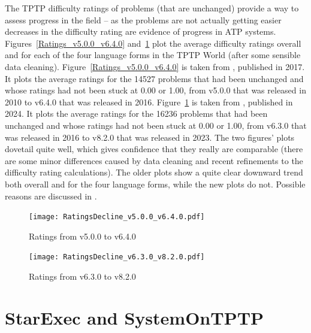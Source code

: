 \documentclass{easychair}
\begin{document}
The TPTP difficulty ratings of problems (that are unchanged) provide a way to assess progress 
in the field -- as the problems are not actually getting easier decreases in the difficulty
rating are evidence of progress in ATP systems.
Figures~\ref{Ratings_v5.0.0_v6.4.0} and~\ref{Ratings_v6.3.0_v8.2.0} plot the average difficulty
ratings overall and for each of the four language forms in the TPTP World (after some sensible
data cleaning).
Figure~\ref{Ratings_v5.0.0_v6.4.0} is taken from \cite{Sut17}, published in 2017.
It plots the average ratings for the 14527 problems that had been unchanged and whose ratings 
had not been stuck at 0.00 or 1.00, from v5.0.0 that was released in 2010 to v6.4.0 that was
released in 2016. 
Figure~\ref{Ratings_v6.3.0_v8.2.0} is taken from \cite{SK+24}, published in 2024.
It plots the average ratings for the 16236 problems that had been unchanged and whose ratings 
had not been stuck at 0.00 or 1.00, from v6.3.0 that was released in 2016 to v8.2.0 that was
released in 2023. 
The two figures’ plots dovetail quite well, which gives confidence that they really are 
comparable (there are some minor differences caused by data cleaning and recent refinements to 
the difficulty rating calculations). 
The older plots show a quite clear downward trend both overall and for the four language forms, 
while the new plots do not. 
Possible reasons are discussed in \cite{SK+24}.

\begin{figure}[t!]
\centering
\begin{minipage}[t]{.49\textwidth}
  \centering
  \texttt{[image: RatingsDecline\_v5.0.0\_v6.4.0.pdf]}
  \vspace*{-2em}
  \caption{Ratings from v5.0.0 to v6.4.0}
  \label{Ratings_v5.0.0_v6.4.0}
\end{minipage}
\begin{minipage}[t]{.49\textwidth}
  \centering
  \texttt{[image: RatingsDecline\_v6.3.0\_v8.2.0.pdf]}
  \vspace*{-2em}
  \caption{Ratings from v6.3.0 to v8.2.0}
  \label{Ratings_v6.3.0_v8.2.0}
\end{minipage}
\end{figure}

\section{StarExec and SystemOnTPTP}
\label{StarExec}
\end{document}
